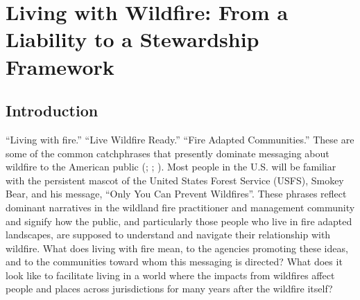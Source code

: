 \documentclass[
]{article}
\begin{document}
\clearpage

\section{Living with Wildfire: From a Liability to a Stewardship Framework}\label{living-with-wildfire-from-a-liability-to-a-stewardship-framework}

\renewcommand{\thefigure}{3.\arabic{figure}}
\setcounter{figure}{0}
\renewcommand{\thetable}{3.\arabic{table}}
\setcounter{table}{0}
\renewcommand{\theequation}{3.\arabic{equation}}
\setcounter{equation}{0}

\subsection{Introduction}\label{introduction-2}

``Living with fire.'' ``Live Wildfire Ready.'' ``Fire Adapted Communities.'' These are some of the common catchphrases that presently dominate messaging about wildfire to the American public (; ; ). Most people in the U.S. will be familiar with the persistent mascot of the United States Forest Service (USFS), Smokey Bear, and his message, ``Only You Can Prevent Wildfires''. These phrases reflect dominant narratives in the wildland fire practitioner and management community and signify how the public, and particularly those people who live in fire adapted landscapes, are supposed to understand and navigate their relationship with wildfire. What does living with fire mean, to the agencies promoting these ideas, and to the communities toward whom this messaging is directed? What does it look like to facilitate living in a world where the impacts from wildfires affect people and places across jurisdictions for many years after the wildfire itself?
\end{document}
